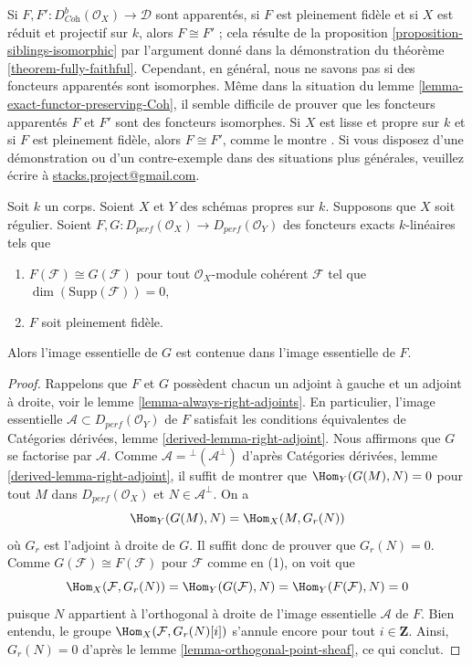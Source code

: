 \begin{remark}
\label{remark-difficult}
Si $F, F' : D^b_{\textit{Coh}}(\mathcal{O}_X) \to \mathcal{D}$ sont apparentés, si $F$
est pleinement fidèle et si $X$ est réduit et projectif sur $k$, alors
$F \cong F'$ ; cela résulte de la
proposition \ref{proposition-siblings-isomorphic} par l'argument
donné dans la démonstration du théorème \ref{theorem-fully-faithful}.
Cependant, en général, nous ne savons pas si des foncteurs apparentés sont isomorphes.
Même dans la situation du lemme \ref{lemma-exact-functor-preserving-Coh},
il semble difficile de prouver que les foncteurs apparentés $F$ et $F'$
sont des foncteurs isomorphes. Si $X$ est lisse et propre sur $k$
et si $F$ est pleinement fidèle, alors $F \cong F'$, comme le montre
\cite{Noah}.
Si vous disposez d'une démonstration ou d'un contre-exemple dans des situations plus générales,
veuillez écrire à
\href{mailto:stacks.project@gmail.com}{stacks.project@gmail.com}.
\end{remark}

\begin{lemma}
\label{lemma-two-functors-pre}
Soit $k$ un corps. Soient $X$ et $Y$ des schémas propres sur $k$. Supposons
que $X$ soit régulier. Soient
$F, G : D_{perf}(\mathcal{O}_X) \to D_{perf}(\mathcal{O}_Y)$
des foncteurs exacts $k$-linéaires tels que
\begin{enumerate}
\item $F(\mathcal{F}) \cong G(\mathcal{F})$ pour tout
$\mathcal{O}_X$-module cohérent $\mathcal{F}$ tel que $\dim(\text{Supp}(\mathcal{F})) = 0$,
\item $F$ soit pleinement fidèle.
\end{enumerate}
Alors l'image essentielle de $G$ est contenue dans l'image essentielle
de $F$.
\end{lemma}

\begin{proof}
Rappelons que $F$ et $G$ possèdent chacun un adjoint à gauche et un adjoint à droite, voir le
lemme \ref{lemma-always-right-adjoints}. En particulier,
l'image essentielle $\mathcal{A} \subset D_{perf}(\mathcal{O}_Y)$ de $F$
satisfait les conditions équivalentes de
Catégories dérivées, lemme \ref{derived-lemma-right-adjoint}.
Nous affirmons que $G$ se factorise par $\mathcal{A}$.
Comme $\mathcal{A} = {}^\perp(\mathcal{A}^\perp)$ d'après
Catégories dérivées, lemme \ref{derived-lemma-right-adjoint},
il suffit de montrer que $\Hom_Y(G(M), N) = 0$ pour
tout $M$ dans $D_{perf}(\mathcal{O}_X)$ et $N \in \mathcal{A}^\perp$.
On a
$$
\Hom_Y(G(M), N) = \Hom_X(M, G_r(N))
$$
où $G_r$ est l'adjoint à droite de $G$. Il suffit donc de prouver
que $G_r(N) = 0$. Comme
$G(\mathcal{F}) \cong F(\mathcal{F})$ pour $\mathcal{F}$ comme en (1),
on voit que
$$
\Hom_X(\mathcal{F}, G_r(N)) =
\Hom_Y(G(\mathcal{F}), N) =
\Hom_Y(F(\mathcal{F}), N) = 0
$$
puisque $N$ appartient à l'orthogonal à droite de l'image essentielle $\mathcal{A}$ de $F$.
Bien entendu, le groupe $\Hom_X(\mathcal{F}, G_r(N)[i])$ s'annule encore
pour tout $i \in \mathbf{Z}$. Ainsi, $G_r(N) = 0$ d'après le
lemme \ref{lemma-orthogonal-point-sheaf}, ce qui conclut.
\end{proof}

